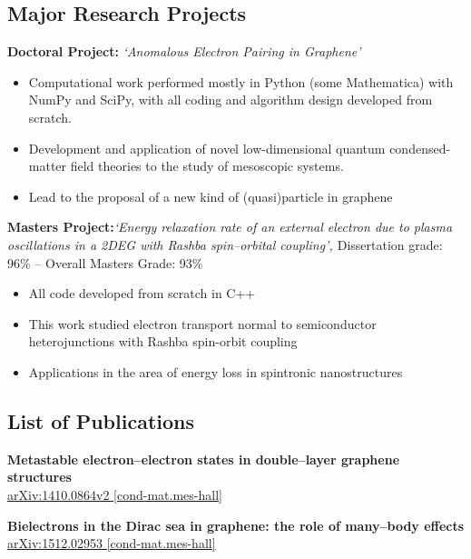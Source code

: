 \documentclass[11pt,a4paper,sans]{moderncv}        %
\begin{document}
\vspace{5pt}

\subsection{Major Research Projects}

\vspace{5pt}

\begin{itemize}
\small{
\item{\textbf{Doctoral Project:} \textit{\small{`Anomalous Electron Pairing in Graphene'}}
\small{\begin{itemize}
\item Computational work performed mostly in Python (some Mathematica) with NumPy and SciPy, with all coding and algorithm design developed from scratch.
\item Development and application of novel low-dimensional quantum condensed-matter field theories to the study of mesoscopic systems.
\item Lead to the proposal of a new kind of (quasi)particle in graphene
\end{itemize}}}
\item{\textbf{Masters Project:}\textit{\small{`Energy relaxation rate of an external electron due to plasma oscillations in a 2DEG with Rashba spin--orbital coupling', }}\small{Dissertation grade: 96\% -- Overall Masters Grade: 93\%}
\small{\begin{itemize}
\item All code developed from scratch in C++
\item This work studied electron transport normal to semiconductor heterojunctions with Rashba spin-orbit coupling
\item Applications in the area of energy loss in spintronic nanostructures
\end{itemize}}}}
\end{itemize}
\vspace{5pt}
\subsection{List of Publications}

\vspace{5pt}

\begin{itemize}
\small{
\item{\textbf{Metastable electron--electron states in double--layer graphene structures}\\
      \textcolor{blue}{\underline{\href{https://arxiv.org/abs/1410.0864}{\small{arXiv:1410.0864v2 [cond-mat.mes-hall]}}}}}

\vspace{4pt}

\item{\textbf{Bielectrons in the Dirac sea in graphene: the role of many–body effects}\\
		\textcolor{blue}{\underline{\href{http://arxiv.org/abs/1512.02953}{\small{arXiv:1512.02953 [cond-mat.mes-hall]}}}}}
\small}
\end{itemize}
\end{document}
